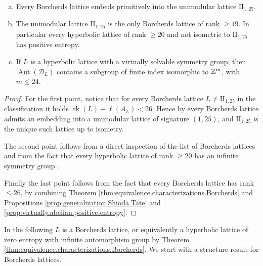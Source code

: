 \documentclass[11pt,letterpaper]{amsart}
\DeclareMathOperator{\rk}{rk}
\DeclareMathOperator{\Aut}{Aut}
\begin{document}
\begin{corollary}\hfill
\begin{enumerate}[(a)]
    \item Every Borcherds lattice embeds primitively into the unimodular lattice $\mathrm{II}_{1,25}$.
    \item The unimodular lattice $\mathrm{II}_{1,25}$ is the only Borcherds lattice of rank $\ge 19$. In particular every hyperbolic lattice of rank $\ge 20$ and not isometric to $\mathrm{II}_{1,25}$ has positive entropy.
    \item If $L$ is a hyperbolic lattice with a virtually solvable symmetry group, then $\Aut(\mathcal{D}_L)$ contains a subgroup of finite index isomorphic to $\mathbb{Z}^m$, with $m\le 24$.
\end{enumerate}
\end{corollary}
\begin{proof}
For the first point, notice that for every Borcherds lattice $L\ne \mathrm{II}_{1,25}$ in the classification it holds $\rk(L)+\ell(A_L) < 26$. Hence by \cite[Corollary~1.12.3]{nikulin.integral.symmetric.bilinear} every Borcherds lattice admits an embedding into a unimodular lattice of signature $(1,25)$, and $\mathrm{II}_{1,25}$ is the unique such lattice up to isometry.

The second point follows from a direct inspection of the list of Borcherds lattices and from the fact that every hyperbolic lattice of rank $\ge 20$ has an infinite symmetry group \cite{nikulin.finite.aut.greater.5}.

Finally the last point follows from the fact that every Borcherds lattice has rank $\le 26$, by combining Theorem \ref{thm:equivalence.characterizations.Borcherds} and Propositions \ref{prop:generalization.Shioda.Tate} and \ref{prop:virtually.abelian.positive.entropy}.
\end{proof}

In the following $L$ is a Borcherds lattice, or equivalently a hyperbolic lattice of zero entropy with infinite automorphism group by Theorem \ref{thm:equivalence.characterizations.Borcherds}.
We start with a structure result for Borcherds lattices.
\end{document}
